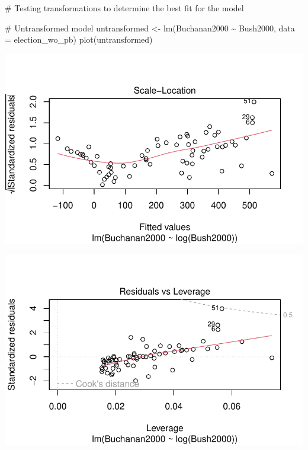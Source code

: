 \documentclass[
  letterpaper,
  DIV=11,
  numbers=noendperiod]{scrartcl}
\newenvironment{Shaded}{\begin{snugshade}}{\end{snugshade}}
\newcommand{\AttributeTok}[1]{\textcolor[rgb]{0.40,0.45,0.13}{#1}}
\newcommand{\CommentTok}[1]{\textcolor[rgb]{0.37,0.37,0.37}{#1}}
\newcommand{\FunctionTok}[1]{\textcolor[rgb]{0.28,0.35,0.67}{#1}}
\newcommand{\NormalTok}[1]{\textcolor[rgb]{0.00,0.23,0.31}{#1}}
\newcommand{\OtherTok}[1]{\textcolor[rgb]{0.00,0.23,0.31}{#1}}
\newcommand{\SpecialCharTok}[1]{\textcolor[rgb]{0.37,0.37,0.37}{#1}}
\begin{document}
\begin{Shaded}
\begin{Highlighting}[]
\CommentTok{\# Testing transformations to determine the best fit for the model}

\CommentTok{\# Untransformed model}
\NormalTok{untransformed }\OtherTok{\textless{}{-}} \FunctionTok{lm}\NormalTok{(Buchanan2000 }\SpecialCharTok{\textasciitilde{}}\NormalTok{ Bush2000, }\AttributeTok{data =}\NormalTok{ election\_wo\_pb)}
\FunctionTok{plot}\NormalTok{(untransformed)}
\end{Highlighting}
\end{Shaded}

\includegraphics{case_study_1_files/figure-pdf/unnamed-chunk-3-3.pdf}

\includegraphics{case_study_1_files/figure-pdf/unnamed-chunk-3-4.pdf}
\end{document}
